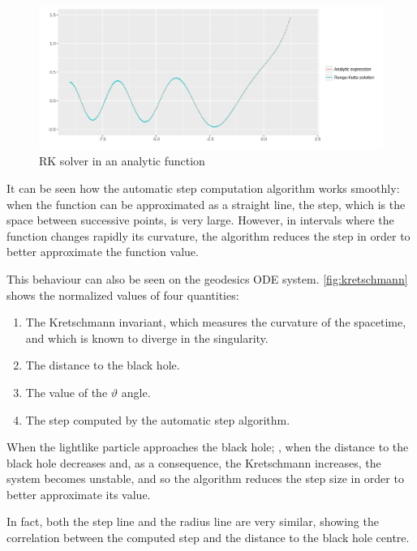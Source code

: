 \begin{figure}[bth]
	\myfloatalign
	\includegraphics[width=1.3\linewidth]{gfx/analytic}
	\caption[\ac{RK} solver in an analytic function]{\ac{RK} solver in an analytic function}
	\label{fig:stepsize}
\end{figure}

It can be seen how the automatic step computation algorithm works smoothly: when the function can be approximated as a straight line, the step, which is the space between successive points, is very large. However, in intervals where the function changes rapidly its curvature, the algorithm reduces the step in order to better approximate the function value.

This behaviour can also be seen on the geodesics \ac{ODE} system. \autoref{fig:kretschmann} shows the normalized values of four quantities:
\begin{enumerate}
	\item The Kretschmann invariant, which measures the curvature of the spacetime, and which is known to diverge in the singularity.
	\item The distance to the black hole.
	\item The value of the $\vartheta$ angle.
	\item The step computed by the automatic step algorithm.
\end{enumerate}

When the lightlike particle approaches the black hole; \ie, when the distance to the black hole decreases and, as a consequence, the Kretschmann increases, the system becomes unstable, and so the algorithm reduces the step size in order to better approximate its value.

In fact, both the step line and the radius line are very similar, showing the correlation between the computed step and the distance to the black hole centre.

